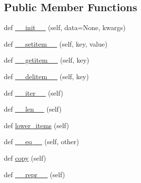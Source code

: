 \subsection*{Public Member Functions}
\begin{DoxyCompactItemize}
\item 
def \hyperlink{classpip_1_1__vendor_1_1requests_1_1structures_1_1CaseInsensitiveDict_a85bfaabcd91bb371214d628ca6ed9cf8}{\+\_\+\+\_\+init\+\_\+\+\_\+} (self, data=None, kwargs)
\item 
def \hyperlink{classpip_1_1__vendor_1_1requests_1_1structures_1_1CaseInsensitiveDict_a16c056f286a68dde67716640b97c807b}{\+\_\+\+\_\+setitem\+\_\+\+\_\+} (self, key, value)
\item 
def \hyperlink{classpip_1_1__vendor_1_1requests_1_1structures_1_1CaseInsensitiveDict_ad182b457568f48d8256ddd0f3d449224}{\+\_\+\+\_\+getitem\+\_\+\+\_\+} (self, key)
\item 
def \hyperlink{classpip_1_1__vendor_1_1requests_1_1structures_1_1CaseInsensitiveDict_aaf6bc922b5d0e1cdd4d7b87a412ff4ab}{\+\_\+\+\_\+delitem\+\_\+\+\_\+} (self, key)
\item 
def \hyperlink{classpip_1_1__vendor_1_1requests_1_1structures_1_1CaseInsensitiveDict_a1f81f59e15854cf8859ca0c37c7d2dfa}{\+\_\+\+\_\+iter\+\_\+\+\_\+} (self)
\item 
def \hyperlink{classpip_1_1__vendor_1_1requests_1_1structures_1_1CaseInsensitiveDict_a2042178015c83c026154034f19fcffbd}{\+\_\+\+\_\+len\+\_\+\+\_\+} (self)
\item 
def \hyperlink{classpip_1_1__vendor_1_1requests_1_1structures_1_1CaseInsensitiveDict_ac97d90e15e0694b54a675b57bcfaac62}{lower\+\_\+items} (self)
\item 
def \hyperlink{classpip_1_1__vendor_1_1requests_1_1structures_1_1CaseInsensitiveDict_a05220b9350871415f0af715ae25e9062}{\+\_\+\+\_\+eq\+\_\+\+\_\+} (self, other)
\item 
def \hyperlink{classpip_1_1__vendor_1_1requests_1_1structures_1_1CaseInsensitiveDict_ab09b26ce2f2055bd81f41caa028d0a0d}{copy} (self)
\item 
def \hyperlink{classpip_1_1__vendor_1_1requests_1_1structures_1_1CaseInsensitiveDict_ae73d2c83e34d03369e5bbe0cc16b3115}{\+\_\+\+\_\+repr\+\_\+\+\_\+} (self)
\end{DoxyCompactItemize}



